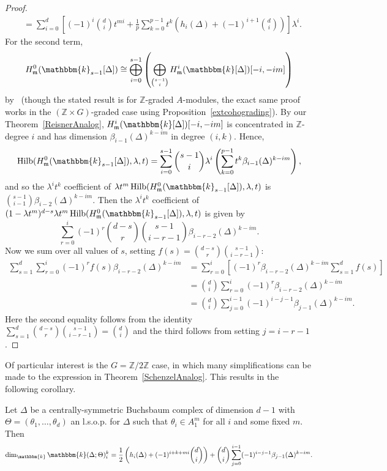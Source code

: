 \documentclass[ALCO,ThmDefs,Unicode]{cedram}
\DeclareMathOperator{\Hilb}{Hilb}
\newcommand{\field}{\mathbbm{k}}
\newcommand{\ZZ}{{\mathbb Z}}
\newcommand{\mideal}{\ensuremath{\mathfrak{m}}}
\begin{document}
\begin{proof}
\begin{align*}
&=\sum_{i=0}^d\left[(-1)^i\binom{d}{i}t^{mi}+\frac{1}{p}\sum_{k=0}^{p-1}t^k\left(h_i(\Delta)+(-1)^{i+1}\binom{d}{i}\right)\right]\lambda^i.
\end{align*}
For the second term,
\[
H_\mideal^0(\field_{s-1}[\Delta])\cong\bigoplus_{i=0}^{s-1}\left(\bigoplus_{\binom{s-1}{i}}H_\mideal^i(\field[\Delta])[-i, -im]\right)
\]
by~\cite[Proposition~II.4.14$'$]{StVo} (though the stated result is for $\ZZ$-graded $A$-modules, the exact same proof works in the $(\ZZ\times G)$-graded case using Proposition~\ref{extcohograding}). By our Theorem~\ref{ReisnerAnalog}, $H^i_\mideal(\field[\Delta])[-i, -im]$ is concentrated in $\ZZ$-degree $i$ and has dimension $\beta_{i-1}(\Delta)^{k-im}$ in degree $(i, k)$. Hence,
\[
\Hilb(H_\mideal^0(\field_{s-1}[\Delta]), \lambda, t)=\sum_{i=0}^{s-1}\binom{s-1}{i}\lambda^i\left(\sum_{k=0}^{p-1}t^k\beta_{i-1}(\Delta)^{k-im}\right),
\]
and so the $\lambda^it^k$ coefficient of $\lambda t^m\Hilb(H_\mideal^0(\field_{s-1}[\Delta]), \lambda, t)$ is $\binom{s-1}{i-1}\beta_{i-2}(\Delta)^{k-im}$. Then the $\lambda^it^k$ coefficient of $(1-\lambda t^m)^{d-s}\lambda t^m\Hilb(H_\mideal^0(\field_{s-1}[\Delta]), \lambda, t)$ is given by
\[
\sum_{r=0}^i(-1)^r\binom{d-s}{r}\binom{s-1}{i-r-1}\beta_{i-r-2}(\Delta)^{k-im}.
\]
Now we sum over all values of $s$, setting $f(s)=\binom{d-s}{r}\binom{s-1}{i-r-1}$:
\begin{align*}
\sum_{s=1}^d\sum_{r=0}^i(-1)^rf(s)\beta_{i-r-2}(\Delta)^{k-im}&=\sum_{r=0}^i\left[(-1)^r\beta_{i-r-2}(\Delta)^{k-im}\sum_{s=1}^df(s)\right]\\
&=\binom{d}{i}\sum_{r=0}^i(-1)^r\beta_{i-r-2}(\Delta)^{k-im}\\
&=\binom{d}{i}\sum_{j=0}^{i-1}(-1)^{i-j-1}\beta_{j-1}(\Delta)^{k-im}.
\end{align*}
Here the second equality follows from the identity $\sum_{s=1}^{d}\binom{d-s}{r}\binom{s-1}{i-r-1}=\binom{d}{i}$ and the third follows from setting $j=i-r-1$.
\end{proof}

Of particular interest is the $G=\ZZ/2\ZZ$ case, in which many simplifications can be made to the expression in Theorem~\ref{SchenzelAnalog}. This results in the following corollary.

\begin{coro}\label{CsSchenzel}
Let $\Delta$ be a centrally-symmetric Buchsbaum complex of dimension $d-1$ with $\Theta=(\theta_1, \ldots, \theta_d)$ an l.s.o.p. for $\Delta$ such that $\theta_i\in A_1^m$ for all $i$ and some fixed $m$. Then
\[
\dim_\field \field(\Delta; \Theta)_i^k = \frac{1}{2}\left(h_i(\Delta)+(-1)^{i+k+mi}\binom{d}{i}\right)+\binom{d}{i}\sum_{j=0}^{i-1}(-1)^{i-j-1}\beta_{j-1}(\Delta)^{k-im}.
\]
\end{coro}
\end{document}
